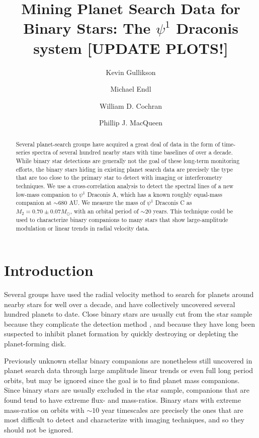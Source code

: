 \documentclass[twocolumn]{emulateapj}
\begin{document}
\title{Mining Planet Search Data for Binary Stars: The $\psi^1$ Draconis system [UPDATE PLOTS!]}
\author{Kevin Gullikson }
\author{Michael Endl }
\author{William D. Cochran }
\author{Phillip J. MacQueen }




\begin{abstract}
Several planet-search groups have acquired a great deal of data in the form of time-series spectra of several hundred nearby stars with time baselines of over a decade. While binary star detections are generally not the goal of these long-term monitoring efforts, the binary stars hiding in existing planet search data are precisely the type that are too close to the primary star to detect with imaging or interferometry techniques. We use a cross-correlation analysis to detect the spectral lines of a new low-mass companion to $\psi^1$ Draconis A, which has a known roughly equal-mass companion at $\sim 680$ AU. We measure the mass of $\psi^1$ Draconis C as $M_2 = 0.70 \pm 0.07 M_{\odot}$, with an orbital period of $\sim 20$ years. This technique could be used to characterize binary companions to many stars that show large-amplitude modulation or linear trends in radial velocity data.
\end{abstract}

\maketitle

\section{Introduction}
\label{sec:intro}
Several groups \citep[e.g.][]{Wittenmyer2006, Fischer2009, Pepe2011} have used the radial velocity method to search for planets around nearby stars for well over a decade, and have collectively uncovered several hundred planets to date. Close binary stars are usually cut from the star sample because they complicate the detection method \citep[e.g.][]{Bergmann2015}, and because they have long been suspected to inhibit planet formation by quickly destroying \citep{Kraus2012} or depleting \citep{Harris2012} the planet-forming disk.

Previously unknown stellar binary companions are nonetheless still uncovered in planet search data through large amplitude linear trends or even full long period orbits, but may be ignored since the goal is to find planet mass companions. Since binary stars are usually excluded in the star sample, companions that are found tend to have extreme flux- and mass-ratios. Binary stars with extreme mass-ratios on orbits with $\sim 10$ year timescales are precisely the ones that are most difficult to detect and characterize with imaging techniques, and so they should not be ignored.
\end{document}

